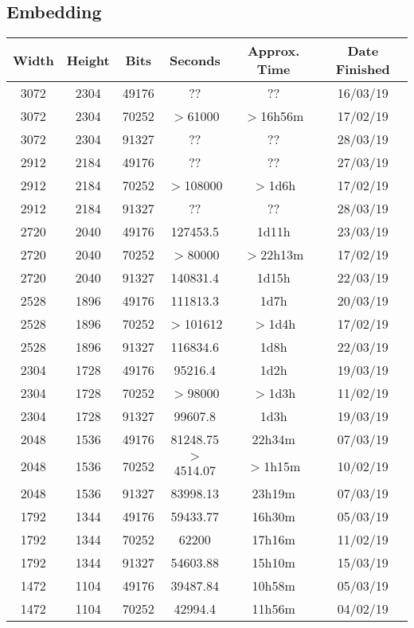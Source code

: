 \subsection{Embedding}
  \begin{center}
  \begin{tabular}{ c c c | c c c }
  Width & Height & Bits & Seconds & Approx. Time & Date Finished \\ \hline
  3072 & 2304 & 49176 & ?? & ?? & 16/03/19 \\ %
  3072 & 2304 & 70252 & $>$61000 & $>$16h56m & 17/02/19 \\
  3072 & 2304 & 91327 & ?? & ?? & 28/03/19 \\ %
  2912 & 2184 & 49176 & ?? & ?? & 27/03/19 \\ %
  2912 & 2184 & 70252 & $>$108000 & $>$1d6h & 17/02/19 \\
  2912 & 2184 & 91327 & ?? & ?? & 28/03/19 \\ %
  2720 & 2040 & 49176 & 127453.5 & 1d11h & 23/03/19 \\
  2720 & 2040 & 70252 & $>$80000 & $>$22h13m & 17/02/19 \\
  2720 & 2040 & 91327 & 140831.4 & 1d15h & 22/03/19 \\
  2528 & 1896 & 49176 & 111813.3 & 1d7h & 20/03/19 \\
  2528 & 1896 & 70252 & $>$101612 & $>$1d4h & 17/02/19 \\
  2528 & 1896 & 91327 & 116834.6 & 1d8h & 22/03/19 \\
  2304 & 1728 & 49176 & 95216.4 & 1d2h & 19/03/19 \\
  2304 & 1728 & 70252 & $>$98000 & $>$1d3h & 11/02/19 \\
  2304 & 1728 & 91327 & 99607.8 & 1d3h & 19/03/19 \\
  2048 & 1536 & 49176 & 81248.75 & 22h34m & 07/03/19 \\
  2048 & 1536 & 70252 & $>$4514.07 & $>$1h15m & 10/02/19 \\
  2048 & 1536 & 91327 & 83998.13 & 23h19m & 07/03/19 \\
  1792 & 1344 & 49176 & 59433.77 & 16h30m & 05/03/19 \\
  1792 & 1344 & 70252 & 62200 & 17h16m & 11/02/19 \\
  1792 & 1344 & 91327 & 54603.88 & 15h10m & 15/03/19 \\
  1472 & 1104 & 49176 & 39487.84 & 10h58m & 05/03/19 \\
  1472 & 1104 & 70252 & 42994.4 & 11h56m & 04/02/19 \\

\end{tabular}
\end{center}

